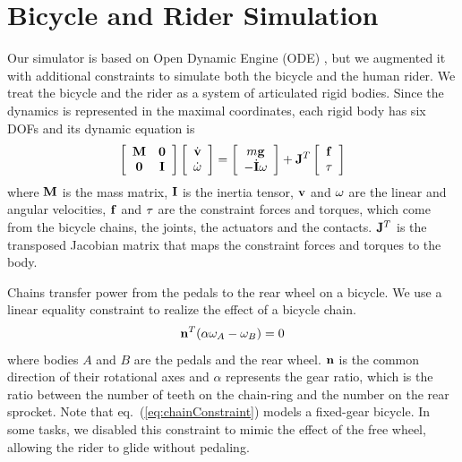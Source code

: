 \section{Bicycle and Rider Simulation}
Our simulator is based on Open Dynamic Engine (ODE) \cite{ode:2008},
but we augmented it with additional constraints to simulate both the
bicycle and the human rider. We treat the bicycle and the rider as a
system of articulated rigid bodies. Since the dynamics is represented
in the maximal coordinates, each rigid body has six DOFs and its
dynamic equation is
\begin{equation}
\left[\begin{array}{cc}
\mathbf{M} & \mathbf{0} \\
\mathbf{0} & \mathbf{I}
\end{array}\right]
\left[\begin{array}{c}
\dot{\mathbf{v}} \\
\dot{\mathbf{\omega}}
\end{array}\right]=
\left[\begin{array}{c}
m\mathbf{g} \\
-\dot{\mathbf{I}}\mathbf{\omega}
\end{array}\right]
+\mathbf{J}^T
\left[\begin{array}{c}
\mathbf{f}\\
\mathbf{\tau}
\end{array}\right]
\label{eq:dynamics}
\end{equation}
where $\mathbf{M}$ is the mass matrix, $\mathbf{I}$ is the inertia tensor, $\mathbf{v}$ and $\mathbf{\omega}$ are the linear and angular velocities, $\mathbf{f}$ and $\mathbf{\tau}$ are the constraint forces and torques, which come from the bicycle chains, the joints, the actuators and the contacts. $\mathbf{J}^T$ is the transposed Jacobian matrix that maps the constraint forces and torques to the body.

Chains transfer power from the pedals to the rear wheel on a bicycle. We use a linear equality constraint to realize the effect of a bicycle chain.
\begin{equation}
\mathbf{n}^T(\alpha\mathbf{\omega}_A-\mathbf{\omega}_B)=0
\label{eq:chainConstraint}
\end{equation}
where bodies $A$ and $B$ are the pedals and the rear wheel. $\mathbf{n}$ is the common direction of their rotational axes and $\alpha$ represents the gear ratio, which is the ratio between the number of teeth on the chain-ring and the number on the rear sprocket. Note that eq.~(\ref{eq:chainConstraint}) models a fixed-gear bicycle. In some tasks, we disabled this constraint to mimic the effect of the free wheel, allowing the rider to glide without pedaling.

